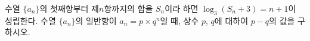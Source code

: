 수열 $\{a_n\}$의 첫째항부터 제$n$항까지의 합을 $S_n$이라 하면 $\log_3 (S_n+3)=n+1$이 성립한다. 수열 $\{a_n\}$의 일반항이 $a_n=p\times q^n$일 때, 상수 $p$, $q$에 대하여 $p-q$의 값을 구하시오.
